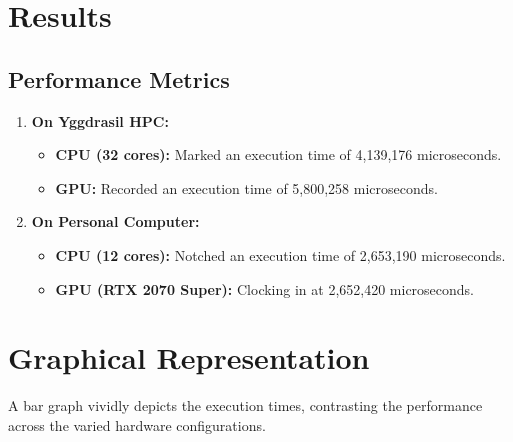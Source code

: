 \hypertarget{results}{%
\section{Results}\label{results}}

\hypertarget{performance-metrics}{%
\subsection{Performance Metrics}\label{performance-metrics}}

\begin{enumerate}
\def\labelenumi{\arabic{enumi}.}
\tightlist
\item
  \textbf{On Yggdrasil HPC:}

  \begin{itemize}
  \tightlist
  \item
    \textbf{CPU (32 cores):} Marked an execution time of 4,139,176
    microseconds.
  \item
    \textbf{GPU:} Recorded an execution time of 5,800,258 microseconds.
  \end{itemize}
\item
  \textbf{On Personal Computer:}

  \begin{itemize}
  \tightlist
  \item
    \textbf{CPU (12 cores):} Notched an execution time of 2,653,190
    microseconds.
  \item
    \textbf{GPU (RTX 2070 Super):} Clocking in at 2,652,420
    microseconds.
  \end{itemize}
\end{enumerate}

\hypertarget{graphical-representation}{%
\section{Graphical Representation}\label{graphical-representation}}

A bar graph vividly depicts the execution times, contrasting the
performance across the varied hardware configurations.

